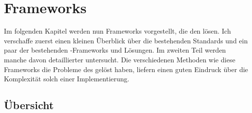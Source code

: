 \chapter{Frameworks} \label{frameworks}

Im folgenden Kapitel werden nun Frameworks vorgestellt, die den \IMfull lösen. Ich verschaffe zuerst einen kleinen Überblick über die bestehenden Standards und ein paar der bestehenden \ORM-Frameworks und Lösungen. Im zweiten Teil werden manche davon detaillierter untersucht. Die verschiedenen Methoden wie diese Frameworks die Probleme des \IM gelöst haben, liefern einen guten Eindruck über die Komplexität solch einer Implementierung.

\section{Übersicht}

